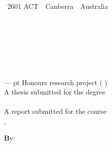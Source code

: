 
%
%


\thispagestyle{empty}



\ifStandardTitle %

\noindent
\begin{minipage}[t]{6cm}%
{\footnotesize%
 \\
~2601 ACT~\textbar~Canberra~\textbar~Australia}
\end{minipage}%
\hfill%
\begin{minipage}[b]{10cm}%
\hfill{}
\end{minipage}


\ \\[2em]
\phantom{x} \hfill\parbox[t]{44.5 mm}{\bfseries \School\\[.5em]
\hfill\mdseries \College}\\[6 em]
\hfill

\noindent
\parbox{140mm}{\sffamily \bfseries \LARGE %
\ProjectTitle%
}\\[.75 em]
{--- \ProjectPoints{} pt \ifHonoursThesis Honours \else research \fi project (\Semester{} \Year)}\\[3 em]


\ifHonoursThesis%
A thesis submitted for the degree\\
\emph{\Degree}\\[3 em]
\else%
A report submitted for the course\\
\emph{\CourseCode, \CourseName}\\[3 em]
\fi




\noindent
{\footnotesize \textbf By:}\\
\AuthorName\\[2em]



